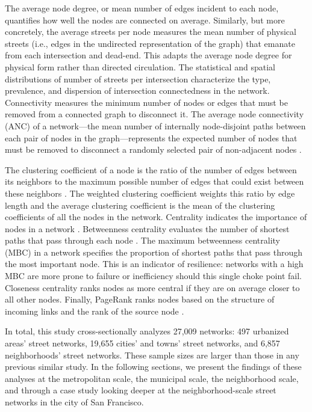 \documentclass{article}
\begin{document}
The average node degree, or mean number of edges incident to each node, quantifies how well the nodes are connected on average. Similarly, but more concretely, the average streets per node measures the mean number of physical streets (i.e., edges in the undirected representation of the graph) that emanate from each intersection and dead-end. This adapts the average node degree for physical form rather than directed circulation. The statistical and spatial distributions of number of streets per intersection characterize the type, prevalence, and dispersion of intersection connectedness in the network. Connectivity measures the minimum number of nodes or edges that must be removed from a connected graph to disconnect it. The average node connectivity (ANC) of a network---the mean number of internally node-disjoint paths between each pair of nodes in the graph---represents the expected number of nodes that must be removed to disconnect a randomly selected pair of non-adjacent nodes \cite{beineke_average_2002,dankelmann_bounds_2003}. 

The clustering coefficient of a node is the ratio of the number of edges between its neighbors to the maximum possible number of edges that could exist between these neighbors \cite{jiang_topological_2004, opsahl_clustering_2009}. The weighted clustering coefficient weights this ratio by edge length and the average clustering coefficient is the mean of the clustering coefficients of all the nodes in the network. Centrality indicates the importance of nodes in a network \cite{huang_trajgraph:_2016, zhong_revealing_2017}. Betweenness centrality evaluates the number of shortest paths that pass through each node \cite{barthelemy_betweenness_2004}. The maximum betweenness centrality (MBC) in a network specifies the proportion of shortest paths that pass through the most important node. This is an indicator of resilience: networks with a high MBC are more prone to failure or inefficiency should this single choke point fail. Closeness centrality ranks nodes as more central if they are on average closer to all other nodes. Finally, PageRank ranks nodes based on the structure of incoming links and the rank of the source node \cite{brin_anatomy_1998, jiang_predicting_2008, agryzkov_algorithm_2012, chin_geographically_2015, gleich_pagerank_2015}.

In total, this study cross-sectionally analyzes 27,009 networks: 497 urbanized areas' street networks, 19,655 cities' and towns' street networks, and 6,857 neighborhoods' street networks. These sample sizes are larger than those in any previous similar study. In the following sections, we present the findings of these analyses at the metropolitan scale, the municipal scale, the neighborhood scale, and through a case study looking deeper at the neighborhood-scale street networks in the city of San Francisco.
\end{document}
